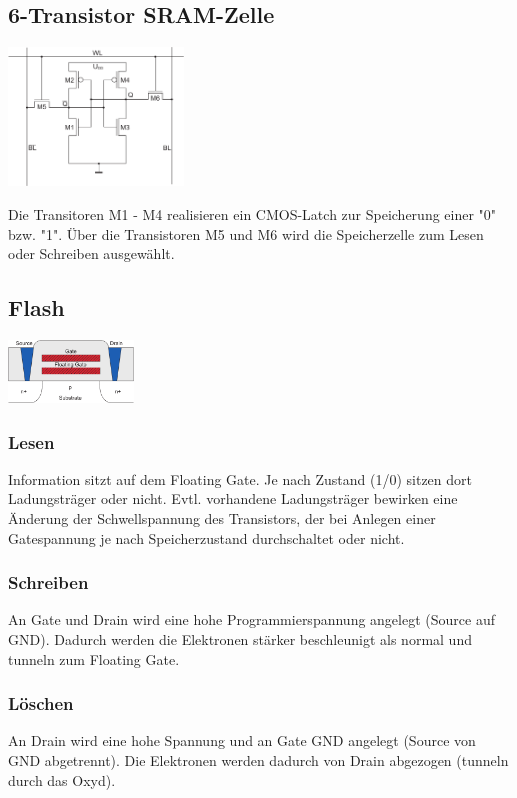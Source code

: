 \documentclass[a4paper,twocolumn,10pt]{article}
\begin{document}
\subsection*{6-Transistor SRAM-Zelle}
\begin{center}
\includegraphics[width=0.35\textwidth]{Grafiken/6-Transistor-SRAM}
\end{center}
Die Transitoren M1 - M4 realisieren ein CMOS-Latch zur Speicherung einer "0" bzw. "1".
Über die Transistoren M5 und M6 wird die Speicherzelle zum Lesen oder Schreiben ausgewählt.

\subsection*{Flash}
\begin{center}
\includegraphics[width=0.25\textwidth]{Grafiken/Flash}
\end{center}
\subsubsection*{Lesen}
Information sitzt auf dem Floating Gate. Je nach Zustand (1/0) sitzen dort Ladungsträger oder nicht.
Evtl. vorhandene Ladungsträger bewirken eine Änderung der Schwellspannung des Transistors, der bei Anlegen einer Gatespannung je nach Speicherzustand durchschaltet oder nicht.

\subsubsection*{Schreiben}
An Gate und Drain wird eine hohe Programmierspannung angelegt (Source auf GND).
Dadurch werden die Elektronen stärker beschleunigt als normal und tunneln zum Floating Gate.

\subsubsection*{Löschen}
An Drain wird eine hohe Spannung und an Gate GND angelegt (Source von GND abgetrennt).
Die Elektronen werden dadurch von Drain abgezogen (tunneln durch das Oxyd).
\end{document}
